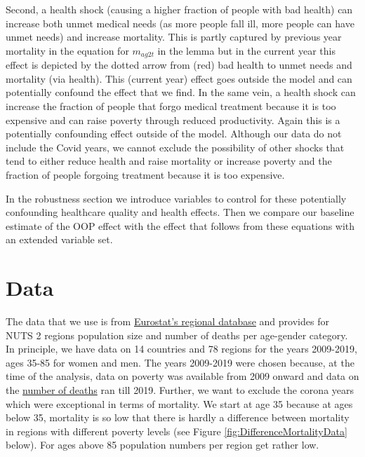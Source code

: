 \documentclass[a4paper,12pt]{article}
\begin{document}
Second, a health shock (causing a higher fraction of people with bad health) can increase both unmet medical needs (as more people fall ill, more people can have unmet needs) and increase mortality. This is partly captured by previous year mortality in the equation for \(m_{ag2t}\) in the lemma but in the current year this effect is depicted by the dotted arrow from (red) bad health to unmet needs and mortality (via health). This (current year) effect goes outside the model and can potentially confound the effect that we find. In the same vein, a health shock can increase the fraction of people that forgo medical treatment because it is too expensive and can raise poverty through reduced productivity. Again this is a potentially confounding effect outside of the model. Although our data do not include the Covid years, we cannot exclude the possibility of other shocks that tend to either reduce health and raise mortality or increase poverty and the fraction of people forgoing treatment because it is too expensive.

In the robustness section we introduce variables to control for these potentially confounding healthcare quality and health effects. Then we compare our baseline estimate of the OOP effect with the effect that follows from these equations with an extended variable set. 


\section{Data}
\label{sec:org0d39756}

The data that we use is from \href{https://ec.europa.eu/eurostat/web/regions/data/database}{Eurostat's regional database} and provides for NUTS 2 regions population size and number of deaths per age-gender category. In principle, we have data on 14 countries and 78 regions for the years 2009-2019, ages 35-85 for women and men. The years 2009-2019 were chosen  because, at the time of the analysis, data on poverty was available from 2009 onward and data on the \href{https://ec.europa.eu/eurostat/databrowser/view/demo\_r\_magec/default/table?lang=en}{number of deaths} ran till 2019. Further, we want to exclude the corona years which were exceptional in terms of mortality. We start at age 35 because at ages below 35, mortality is so low that there is hardly a difference between mortality in regions with different poverty levels (see Figure \ref{fig:DifferenceMortalityData} below). For ages above 85 population numbers per region get rather low. 
\end{document}
